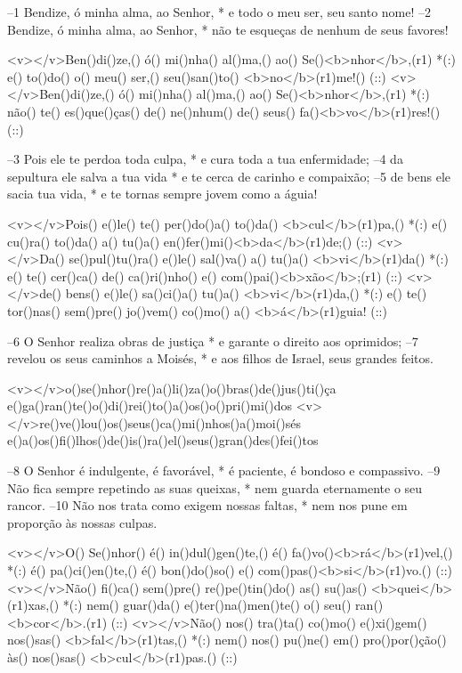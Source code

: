 –1 Bendize, ó minha alma, ao Senhor, *
e todo o meu ser, seu santo nome!
–2 Bendize, ó minha alma, ao Senhor, *
não te esqueças de nenhum de seus favores!

<v></v>Ben()di()ze,() ó() mi()nha() al()ma,() ao() Se()<b>nhor</b>,(r1) *(:)
e() to()do() o() meu() ser,() seu()san()to() <b>no</b>(r1)me!() (::)
<v></v>Ben()di()ze,() ó() mi()nha() al()ma,() ao() Se()<b>nhor</b>,(r1) *(:)
não() te() es()que()ças() de() ne()nhum() de() seus() fa()<b>vo</b>(r1)res!() (::)

–3 Pois ele te perdoa toda culpa, *
e cura toda a tua enfermidade;
–4 da sepultura ele salva a tua vida *
e te cerca de carinho e compaixão;
–5 de bens ele sacia tua vida, *
e te tornas sempre jovem como a águia!

<v></v>Pois() e()le() te() per()do()a() to()da() <b>cul</b>(r1)pa,() *(:)
e() cu()ra() to()da() a() tu()a() en()fer()mi()<b>da</b>(r1)de;() (::)
<v></v>Da() se()pul()tu()ra() e()le() sal()va() a() tu()a() <b>vi</b>(r1)da() *(:)
e() te() cer()ca() de() ca()ri()nho() e() com()pai()<b>xão</b>;(r1) (::)
<v></v>de() bens() e()le() sa()ci()a() tu()a() <b>vi</b>(r1)da,() *(:)
e() te() tor()nas() sem()pre() jo()vem() co()mo() a() <b>á</b>(r1)guia! (::)

–6 O Senhor realiza obras de justiça *
e garante o direito aos oprimidos;
–7 revelou os seus caminhos a Moisés, *
e aos filhos de Israel, seus grandes feitos.

<v></v>o()se()nhor()re()a()li()za()o()bras()de()jus()ti()ça
e()ga()ran()te()o()di()rei()to()a()os()o()pri()mi()dos
<v></v>re()ve()lou()os()seus()ca()mi()nhos()a()moi()sés
e()a()os()fi()lhos()de()is()ra()el()seus()gran()des()fei()tos

–8 O Senhor é indulgente, é favorável, *
é paciente, é bondoso e compassivo.
–9 Não fica sempre repetindo as suas queixas, *
nem guarda eternamente o seu rancor.
–10 Não nos trata como exigem nossas faltas, *
nem nos pune em proporção às nossas culpas.

<v></v>O() Se()nhor() é() in()dul()gen()te,() é() fa()vo()<b>rá</b>(r1)vel,() *(:)
é() pa()ci()en()te,() é() bon()do()so() e() com()pas()<b>si</b>(r1)vo.() (::)
<v></v>Não() fi()ca() sem()pre() re()pe()tin()do() as() su()as() <b>quei</b>(r1)xas,() *(:)
nem() guar()da() e()ter()na()men()te() o() seu() ran()<b>cor</b>.(r1) (::)
<v></v>Não() nos() tra()ta() co()mo() e()xi()gem() nos()sas() <b>fal</b>(r1)tas,() *(:)
nem() nos() pu()ne() em() pro()por()ção() às() nos()sas() <b>cul</b>(r1)pas.() (::)

